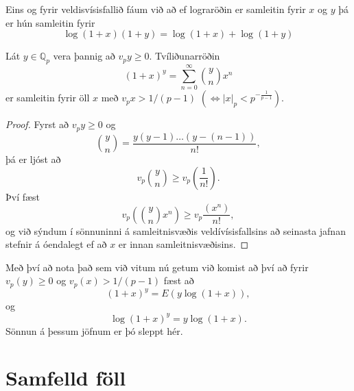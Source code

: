 Eins og fyrir veldisvísisfallið fáum við að ef lograröðin er samleitin fyrir $x$ og $y$ þá er hún samleitin fyrir 
\begin{equation*}
\log (1+x)(1+y) = \log(1+x) + \log(1+y)
\end{equation*} 

\begin{setn}
Lát $y\in \mathbb{Q}_p$ vera þannig að $v_p y \geq 0$. Tvíliðunarröðin 
\begin{equation*}
(1+x)^y = \sum_{n=0}^\infty \binom{y}{n}x^n
\end{equation*}
er samleitin fyrir öll $x$ með $v_px>1/(p-1)$  $( \iff |x|_p <p^{-\frac{1}{p-1}})$.
\end{setn}
\begin{proof}
Fyrst að $v_py\geq0$ og 
\begin{equation*}
\binom{y}{n} = \frac{y(y-1)\ldots (y-(n-1))}{n!},
\end{equation*}
þá er ljóst að
\begin{equation*}
v_p \binom{y}{n} \geq v_p \left( \frac{1}{n!} \right).
\end{equation*}
Því fæst
\begin{equation*}
v_p \left( \binom{y}{n} x^n \right) \geq v_p \frac{(x^n) }{n!},
\end{equation*}
og við sýndum í sönnuninni á samleitnisvæðis veldívísisfallsins að seinasta jafnan stefnir á óendalegt ef að $x$ er innan samleitnisvæðisins.
\end{proof}

Með því að nota það sem við vitum nú getum við komist að því að fyrir $v_p(y) \geq 0$ og $v_p(x) > 1/(p-1)$ fæst að
\begin{equation*}
(1+x)^y = E(y \log(1+x)),
\end{equation*}  
og 
\begin{equation*}
\log(1+x)^y = y \log(1+x).
\end{equation*}
Sönnun á þessum jöfnum er þó sleppt hér.
\section*{Samfelld föll}


